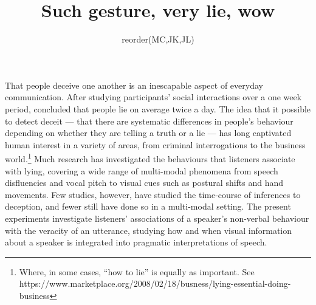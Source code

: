 \documentclass[a4paper,man,natbib]{apa6}
\title{Such gesture, very lie, wow}
\author{reorder(MC,JK,JL)}
\affiliation{Psychology, PPLS, University of Edinburgh}
\begin{document}
\maketitle
\linenumbers
\noindent
That people deceive one another is an inescapable aspect of everyday communication.
After studying participants' social interactions over a one week period, \citet{DePaulo1996} concluded that people lie on average twice a day.
The idea that it possible to detect deceit --- that there are systematic differences in people's behaviour depending on whether they are telling a truth or a lie --- has long captivated human interest in a variety of areas, from criminal interrogations to the business world.\footnote{Where, in some cases, ``how to lie'' is equally as important. See https://www.marketplace.org/2008/02/18/busness/lying-essential-doing-business}
Much research has investigated the behaviours that listeners associate with lying, covering a wide range of multi-modal phenomena from speech disfluencies and vocal pitch to visual cues such as postural shifts and hand movements.
Few studies, however, have studied the time-course of inferences to deception, and fewer still have done so in a multi-modal setting.
The present experiments investigate listeners' associations of a speaker's non-verbal behaviour with the veracity of an utterance, studying how and when visual information about a speaker is integrated into pragmatic interpretations of speech.
\end{document}
